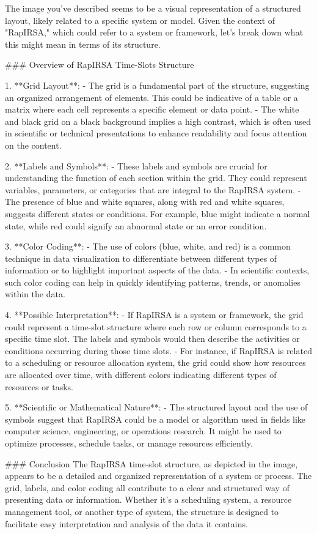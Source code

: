 The image you've described seems to be a visual representation of a structured layout, likely related to a specific system or model. Given the context of "RapIRSA," which could refer to a system or framework, let's break down what this might mean in terms of its structure.

### Overview of RapIRSA Time-Slots Structure

1. **Grid Layout**:
   - The grid is a fundamental part of the structure, suggesting an organized arrangement of elements. This could be indicative of a table or a matrix where each cell represents a specific element or data point.
   - The white and black grid on a black background implies a high contrast, which is often used in scientific or technical presentations to enhance readability and focus attention on the content.

2. **Labels and Symbols**:
   - These labels and symbols are crucial for understanding the function of each section within the grid. They could represent variables, parameters, or categories that are integral to the RapIRSA system.
   - The presence of blue and white squares, along with red and white squares, suggests different states or conditions. For example, blue might indicate a normal state, while red could signify an abnormal state or an error condition.

3. **Color Coding**:
   - The use of colors (blue, white, and red) is a common technique in data visualization to differentiate between different types of information or to highlight important aspects of the data.
   - In scientific contexts, such color coding can help in quickly identifying patterns, trends, or anomalies within the data.

4. **Possible Interpretation**:
   - If RapIRSA is a system or framework, the grid could represent a time-slot structure where each row or column corresponds to a specific time slot. The labels and symbols would then describe the activities or conditions occurring during those time slots.
   - For instance, if RapIRSA is related to a scheduling or resource allocation system, the grid could show how resources are allocated over time, with different colors indicating different types of resources or tasks.

5. **Scientific or Mathematical Nature**:
   - The structured layout and the use of symbols suggest that RapIRSA could be a model or algorithm used in fields like computer science, engineering, or operations research. It might be used to optimize processes, schedule tasks, or manage resources efficiently.

### Conclusion
The RapIRSA time-slot structure, as depicted in the image, appears to be a detailed and organized representation of a system or process. The grid, labels, and color coding all contribute to a clear and structured way of presenting data or information. Whether it's a scheduling system, a resource management tool, or another type of system, the structure is designed to facilitate easy interpretation and analysis of the data it contains.